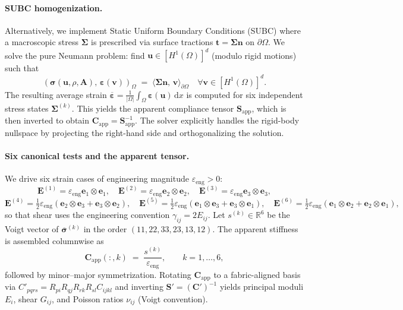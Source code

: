 \paragraph{SUBC homogenization.}
Alternatively, we implement Static Uniform Boundary Conditions (SUBC) where a macroscopic stress $\boldsymbol{\Sigma}$ is prescribed via surface tractions $\mathbf{t} = \boldsymbol{\Sigma}\mathbf{n}$ on $\partial\Omega$. We solve the pure Neumann problem: find $\mathbf{u}\in[H^1(\Omega)]^d$ (modulo rigid motions) such that
\begin{equation}\label{eq:subc-weak}
(\boldsymbol{\sigma}(\mathbf{u},\rho,\mathbf{A}),\,\boldsymbol{\varepsilon}(\mathbf{v}))_{\Omega} \;=\; \langle \boldsymbol{\Sigma}\mathbf{n},\,\mathbf{v}\rangle_{\partial\Omega} \quad \forall \mathbf{v}\in[H^1(\Omega)]^d.
\end{equation}
The resulting average strain $\overline{\boldsymbol{\varepsilon}} = \frac{1}{|\Omega|}\int_\Omega \boldsymbol{\varepsilon}(\mathbf{u})\,\mathrm{d}x$ is computed for six independent stress states $\boldsymbol{\Sigma}^{(k)}$. This yields the apparent compliance tensor $\mathbf{S}_{\mathrm{app}}$, which is then inverted to obtain $\mathbf{C}_{\mathrm{app}} = \mathbf{S}_{\mathrm{app}}^{-1}$. The solver explicitly handles the rigid-body nullspace by projecting the right-hand side and orthogonalizing the solution.

\paragraph{Six canonical tests and the apparent tensor.}
We drive six strain cases of engineering magnitude $\varepsilon_{\mathrm{eng}}>0$:
\[
\mathbf{E}^{(1)}=\varepsilon_{\mathrm{eng}}\mathbf{e}_1\!\otimes\!\mathbf{e}_1,\quad
\mathbf{E}^{(2)}=\varepsilon_{\mathrm{eng}}\mathbf{e}_2\!\otimes\!\mathbf{e}_2,\quad
\mathbf{E}^{(3)}=\varepsilon_{\mathrm{eng}}\mathbf{e}_3\!\otimes\!\mathbf{e}_3,
\]
\[
\mathbf{E}^{(4)}=\tfrac12\varepsilon_{\mathrm{eng}}(\mathbf{e}_2\!\otimes\!\mathbf{e}_3+\mathbf{e}_3\!\otimes\!\mathbf{e}_2),\quad
\mathbf{E}^{(5)}=\tfrac12\varepsilon_{\mathrm{eng}}(\mathbf{e}_1\!\otimes\!\mathbf{e}_3+\mathbf{e}_3\!\otimes\!\mathbf{e}_1),\quad
\mathbf{E}^{(6)}=\tfrac12\varepsilon_{\mathrm{eng}}(\mathbf{e}_1\!\otimes\!\mathbf{e}_2+\mathbf{e}_2\!\otimes\!\mathbf{e}_1),
\]
so that shear uses the engineering convention $\gamma_{ij}=2E_{ij}$. Let $s^{(k)}\in\mathbb{R}^6$ be the Voigt vector of $\overline{\boldsymbol{\sigma}}^{(k)}$ in the order $(11,22,33,23,13,12)$. The apparent stiffness is assembled columnwise as
\begin{equation}\label{eq:kubc-C-nd}
\mathbf{C}_{\mathrm{app}}(:,k)\;=\;\frac{s^{(k)}}{\varepsilon_{\mathrm{eng}}},\qquad k=1,\dots,6,
\end{equation}
followed by minor–major symmetrization. Rotating $\mathbf{C}_{\mathrm{app}}$ to a fabric-aligned basis via $C'_{pqrs}=R_{pi}R_{qj}R_{rk}R_{sl}C_{ijkl}$ and inverting $\mathbf{S}'=(\mathbf{C}')^{-1}$ yields principal moduli $E_i$, shear $G_{ij}$, and Poisson ratios $\nu_{ij}$ (Voigt convention).

